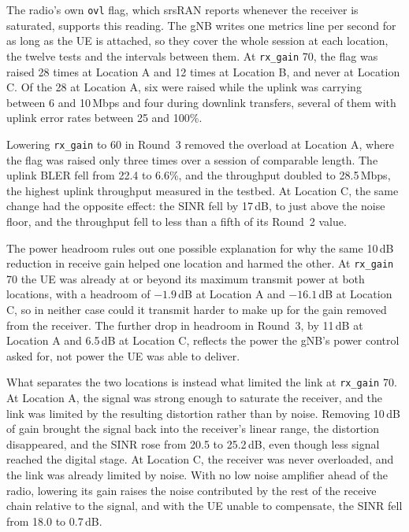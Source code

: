 The radio's own \texttt{ovl} flag, which srsRAN reports whenever the receiver is saturated, supports this reading. The \gls{gNB} writes one metrics line per second for as long as the \gls{UE} is attached, so they cover the whole session at each location, the twelve tests and the intervals between them. At \texttt{rx\_gain} 70, the flag was raised 28 times at Location A and 12 times at Location B, and never at Location C. Of the 28 at Location A, six were raised while the uplink was carrying between 6 and 10\,Mbps and four during downlink transfers, several of them with uplink error rates between 25 and 100\%.

Lowering \texttt{rx\_gain} to 60 in Round~3 removed the overload at Location A, where the flag was raised only three times over a session of comparable length. The uplink \gls{BLER} fell from 22.4 to 6.6\%, and the throughput doubled to 28.5\,Mbps, the highest uplink throughput measured in the testbed. At Location C, the same change had the opposite effect: the \gls{SINR} fell by 17\,dB, to just above the noise floor, and the throughput fell to less than a fifth of its Round~2 value.

The power headroom rules out one possible explanation for why the same 10\,dB reduction in receive gain helped one location and harmed the other. At \texttt{rx\_gain} 70 the \gls{UE} was already at or beyond its maximum transmit power at both locations, with a headroom of $-1.9$\,dB at Location A and $-16.1$\,dB at Location C, so in neither case could it transmit harder to make up for the gain removed from the receiver. The further drop in headroom in Round~3, by 11\,dB at Location A and 6.5\,dB at Location C, reflects the power the \gls{gNB}'s power control asked for, not power the \gls{UE} was able to deliver.

What separates the two locations is instead what limited the link at \texttt{rx\_gain} 70. At Location A, the signal was strong enough to saturate the receiver, and the link was limited by the resulting distortion rather than by noise. Removing 10\,dB of gain brought the signal back into the receiver's linear range, the distortion disappeared, and the \gls{SINR} rose from 20.5 to 25.2\,dB, even though less signal reached the digital stage. At Location C, the receiver was never overloaded, and the link was already limited by noise. With no low noise amplifier ahead of the radio, lowering its gain raises the noise contributed by the rest of the receive chain relative to the signal, and with the \gls{UE} unable to compensate, the \gls{SINR} fell from 18.0 to 0.7\,dB.

